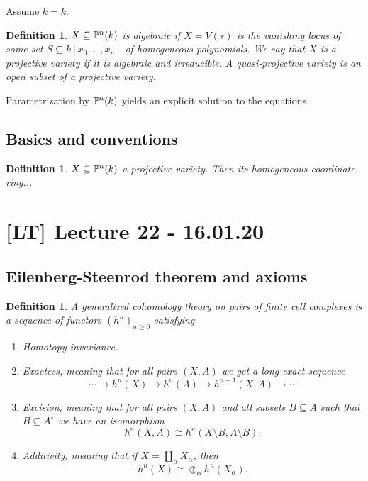 \documentclass[A4paper, british]{amsart}
\theoremstyle{darkgreentheorem}
\theoremstyle{darkbluedefinition}
\newtheorem{defn}[thm]{Definition}
\theoremstyle{darkredexample}
\theoremstyle{remark}
\newcommand{\1}{\mathbbm{1}}
\newcommand{\op}{\oplus}
\newcommand{\sub}{\subseteq}
\begin{document}
Assume $k=\bar{k}$.

\begin{defn}
    $X\sub \P^{n}(k)$ is \textit{algebraic} if $X=V(s)$ is the vanishing locus of some set $S\sub k[x_{0},\ldots,x_{n}]$ of homogeneous polynomials.
    We say that $X$ is a \textit{projective variety} if it is algebraic and irreducible.
    A \textit{quasi-projective variety} is an open subset of a projective variety.
\end{defn}

Parametrization by $\P^{n}(k)$ yields an explicit solution to the equations.

\subsection{Basics and conventions}

\begin{defn}
    $X\sub \P^{n}(k)$ a projective variety.
    Then its \textit{homogeneous coordinate ring}...
\end{defn}

\section{[LT] Lecture 22 - 16.01.20}

\subsection{Eilenberg-Steenrod theorem and axioms}

\begin{defn}
    A \textit{generalized cohomology theory} on pairs of finite cell complexes is a sequence of functors $(h^{n})_{n\geqslant 0}$ satisfying
    \begin{enumerate}[label=(\alph*)]
	\item Homotopy invariance.
	\item Exactess, meaning that for all pairs $(X,A)$ we get a long exact sequence
	    \[ \cdots \to h^{n}(X)\to h^{n}(A)\to h^{n+1}(X,A)\to \cdots \]
	\item Excision, meaning that for all pairs $(X,A)$ and all subsets $B\sub A$ such that $\overline{B}\sub A^{\circ}$ we have an isomorphism
	    \[ h^{n}(X,A)\cong h^{n}(X\setminus B,A\setminus B). \]
	\item Additivity, meaning that if $X=\coprod_{\alpha} X_{\alpha}$, then
	    \[ h^{n}(X)\cong \op_{\alpha}h^{n}(X_{\alpha}). \]
    \end{enumerate}
\end{defn}
\end{document}
